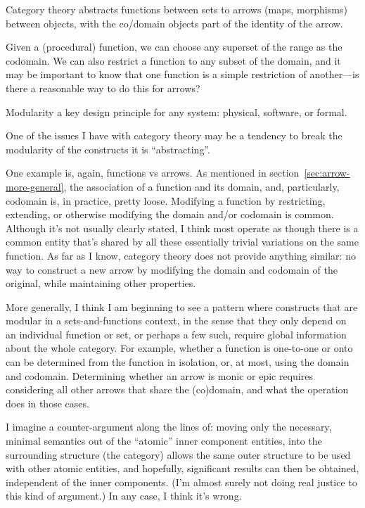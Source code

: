 \documentclass[11pt,openany]{book}
\begin{document}
Category theory abstracts functions between sets to
arrows (maps, morphisms) between objects,
with the co/domain objects part of the identity of the arrow.

Given a (procedural) function,
we can choose any superset of the range as the codomain.
We can also restrict a function to any subset of the domain,
and it may be important to know that one function is a simple 
restriction of another---is there a reasonable way to do this
for arrows?

\label{sec:Modularity_breaking}

Modularity a key design principle for any system: physical, 
software, or formal.

One of the issues I have with category theory
may be a tendency to break the modularity of the constructs it is
``abstracting''.

One example is, again, functions vs arrows.
As mentioned in section~\ref{sec:arrow-more-general},
the association of a function and its domain, and, particularly,
codomain is, in practice, pretty loose.
Modifying a function by restricting, extending, or otherwise
modifying the domain and/or codomain is common.
Although it's not usually clearly stated, 
I think most operate as though there is a common entity
that's shared by all these essentially trivial variations on the
same function.
As far as I know, category theory does not provide anything similar:
no way to construct a new arrow by modifying the domain
and codomain of the original, while maintaining other properties.

More generally, I think I am beginning to see a pattern where
constructs that are modular in a sets-and-functions context,
in the sense that they only depend on an individual function or
set, or perhaps a few such, require global information about
the whole category.
For example, whether a function is one-to-one or onto
can be determined from the function in isolation,
or, at most, using the domain and codomain.
Determining whether an arrow is monic or epic requires
considering all other arrows that share the (co)domain,
and what the \compose operation does in those cases.

I imagine a counter-argument along the lines of:
moving only the necessary, minimal semantics out of the ``atomic''
inner component entities, 
into the surrounding structure (the category) allows the same 
outer structure to be used
with other atomic entities, and hopefully, significant results
can then be obtained, independent of the inner components.
(I'm almost surely not doing real justice to this kind of argument.)
In any case, I think it's wrong.
\end{document}
